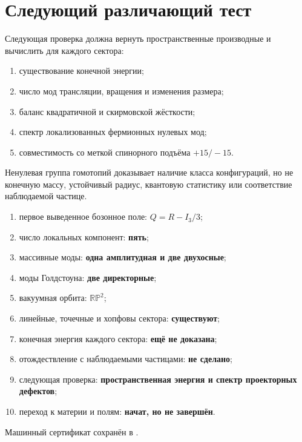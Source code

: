 \section{Следующий различающий тест}

Следующая проверка должна вернуть пространственные производные и вычислить для
каждого сектора:
\begin{enumerate}
 \item существование конечной энергии;
 \item число мод трансляции, вращения и изменения размера;
 \item баланс квадратичной и скирмовской жёсткости;
 \item спектр локализованных фермионных нулевых мод;
 \item совместимость со меткой спинорного подъёма $+15/-15$.
\end{enumerate}

\begin{nogocriterion}
Ненулевая группа гомотопий доказывает наличие класса конфигураций, но не
конечную массу, устойчивый радиус, квантовую статистику или соответствие
наблюдаемой частице.
\end{nogocriterion}

\begin{protocol}
\begin{enumerate}
 \item первое выведенное бозонное поле: \textbf{$Q=R-I_3/3$};
 \item число локальных компонент: \textbf{пять};
 \item массивные моды: \textbf{одна амплитудная и две двухосные};
 \item моды Голдстоуна: \textbf{две директорные};
 \item вакуумная орбита: \textbf{$\mathbb{RP}^2$};
 \item линейные, точечные и хопфовы сектора: \textbf{существуют};
 \item конечная энергия каждого сектора: \textbf{ещё не доказана};
 \item отождествление с наблюдаемыми частицами: \textbf{не сделано};
 \item следующая проверка:
 \textbf{пространственная энергия и спектр проекторных дефектов};
 \item переход к материи и полям: \textbf{начат, но не завершён}.
\end{enumerate}
\end{protocol}

Машинный сертификат сохранён в
.